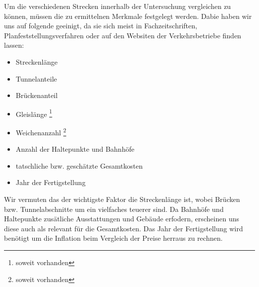 Um die verschiedenen Strecken innerhalb der Untersuchung vergleichen zu können, müssen die zu ermittelnen Merkmale festgelegt werden. Dabie haben wir uns auf folgende geeinigt, da sie sich meist in Fachzeitschriften, Planfeststellungsverfahren oder auf den Websiten der Verkehrsbetriebe finden lassen:

\begin{itemize}
\item Streckenlänge
\item Tunnelanteile
\item Brückenanteil
\item Gleislänge \footnote{soweit vorhanden}
\item Weichenanzahl \footnote{soweit vorhanden}
\item Anzahl der Haltepunkte und Bahnhöfe
\item tatschliche bzw. geschätzte Gesamtkosten
\item Jahr der Fertigstellung
\end{itemize}

Wir vermuten das der wichtigste Faktor die Streckenlänge ist, wobei Brücken bzw. Tunnelabschnitte um ein vielfaches teuerer sind. Da Bahnhöfe und Haltepunkte zusätliche Ausstattungen und Gebäude erfodern, erscheinen uns diese auch als relevant für die Gesamtkosten. Das Jahr der Fertigstellung wird benötigt um die Inflation beim Vergleich der Preise herraus zu rechnen.

